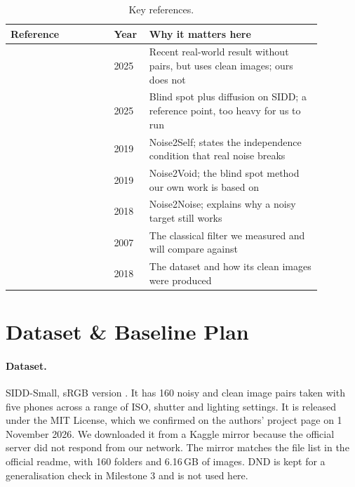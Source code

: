 \documentclass[11pt]{article}
\begin{document}
\begin{table}[ht]
\centering
\caption{Key references.}
\label{tab:refs}
\begin{tabular}{@{}p{0.30\linewidth}p{0.08\linewidth}p{0.50\linewidth}@{}}
\toprule
\textbf{Reference} & \textbf{Year} & \textbf{Why it matters here} \\
\midrule
\citet{chihaoui2025sparsity}   & 2025 & Recent real-world result without pairs, but uses clean images; ours does not \\
\citet{cheng2025blindspot}     & 2025 & Blind spot plus diffusion on SIDD; a reference point, too heavy for us to run \\
\citet{batson2019noise2self}   & 2019 & Noise2Self; states the independence condition that real noise breaks \\
\citet{krull2019noise2void}    & 2019 & Noise2Void; the blind spot method our own work is based on \\
\citet{lehtinen2018noise2noise}& 2018 & Noise2Noise; explains why a noisy target still works \\
\citet{dabov2007bm3d}          & 2007 & The classical filter we measured and will compare against \\
\citet{abdelhamed2018sidd}     & 2018 & The dataset and how its clean images were produced \\
\bottomrule
\end{tabular}
\end{table}

\section{Dataset \& Baseline Plan}
\label{sec:data}

\paragraph{Dataset.}
SIDD-Small, sRGB version \citep{abdelhamed2018sidd}. It has 160 noisy and clean image
pairs taken with five phones across a range of ISO, shutter and lighting settings. It is
released under the MIT License, which we confirmed on the authors' project page on
1 November 2026. We downloaded it from a Kaggle mirror because the official server did not
respond from our network. The mirror matches the file list in the official readme, with
160 folders and 6.16\,GB of images. DND \citep{plotz2017dnd} is kept for a generalisation
check in Milestone 3 and is not used here.
\end{document}
